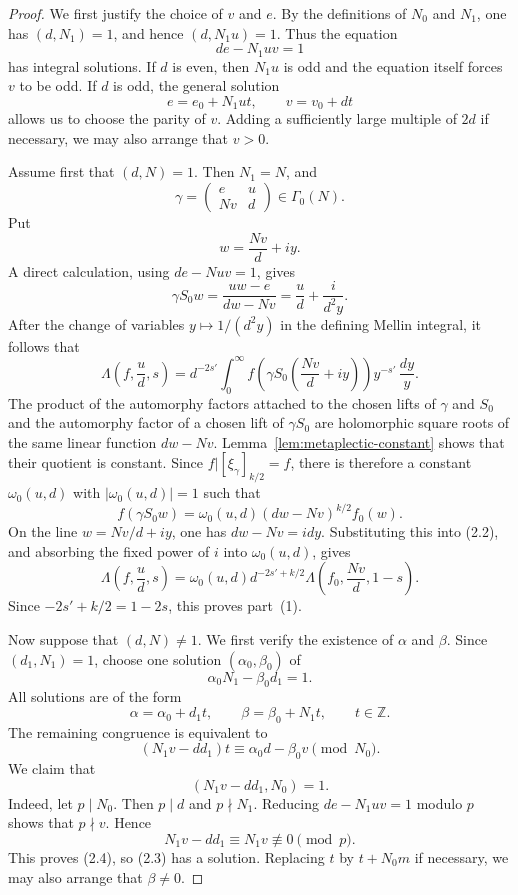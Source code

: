 \documentclass[11pt]{amsart}
\theoremstyle{remark}
\newcommand{\Z}{\mathbb Z}
\begin{document}
\begin{proof}
We first justify the choice of $v$ and $e$. By the definitions of $N_0$ and
$N_1$, one has $(d,N_1)=1$, and hence $(d,N_1u)=1$. Thus the equation
\[
de-N_1uv=1
\]
has integral solutions. If $d$ is even, then $N_1u$ is odd and the equation
itself forces $v$ to be odd. If $d$ is odd, the general solution
\[
e=e_0+N_1ut,\qquad v=v_0+dt
\]
allows us to choose the parity of $v$. Adding a sufficiently large multiple
of $2d$ if necessary, we may also arrange that $v>0$.

Assume first that $(d,N)=1$. Then $N_1=N$, and
\[
\gamma=\begin{pmatrix}e&u\\Nv&d\end{pmatrix}\in\Gamma_0(N).
\]
Put
\[
w=\frac{Nv}{d}+iy.
\]
A direct calculation, using $de-Nuv=1$, gives
\[
\gamma S_0w
=\frac{u w-e}{d w-Nv}
=\frac ud+\frac{i}{d^2y}.
\tag{2.1}
\]
After the change of variables $y\mapsto 1/(d^2y)$ in the defining Mellin
integral, it follows that
\[
\Lambda\left(f,\frac ud,s\right)
=d^{-2s'}\int_0^\infty
f\left(\gamma S_0\left(\frac{Nv}{d}+iy\right)\right)
y^{-s'}\,\frac{dy}{y}.
\tag{2.2}
\]
The product of the automorphy factors attached to the chosen lifts of
$\gamma$ and $S_0$ and the automorphy factor of a chosen lift of
$\gamma S_0$ are holomorphic square roots of the same linear function
$d w-Nv$. Lemma~\ref{lem:metaplectic-constant} shows that their quotient
is constant. Since $f|[\xi_\gamma]_{k/2}=f$, there is therefore a constant
$\omega_0(u,d)$ with $|\omega_0(u,d)|=1$ such that
\[
f(\gamma S_0w)
=\omega_0(u,d)(d w-Nv)^{k/2}f_0(w).
\]
On the line $w=Nv/d+iy$, one has $d w-Nv=idy$. Substituting this into
(2.2), and absorbing the fixed power of $i$ into $\omega_0(u,d)$, gives
\[
\Lambda\left(f,\frac ud,s\right)
=\omega_0(u,d)d^{-2s'+k/2}
\Lambda\left(f_0,\frac{Nv}{d},1-s\right).
\]
Since $-2s'+k/2=1-2s$, this proves part~\textup{(1)}.

Now suppose that $(d,N)\ne1$. We first verify the existence of $\alpha$
and $\beta$. Since $(d_1,N_1)=1$, choose one solution $(\alpha_0,\beta_0)$
of
\[
\alpha_0N_1-\beta_0d_1=1.
\]
All solutions are of the form
\[
\alpha=\alpha_0+d_1t,
\qquad
\beta=\beta_0+N_1t,
\qquad t\in\Z.
\]
The remaining congruence is equivalent to
\[
(N_1v-dd_1)t\equiv \alpha_0d-\beta_0v\pmod{N_0}.
\tag{2.3}
\]
We claim that
\[
(N_1v-dd_1,N_0)=1.
\tag{2.4}
\]
Indeed, let $p\mid N_0$. Then $p\mid d$ and $p\nmid N_1$. Reducing
$de-N_1uv=1$ modulo $p$ shows that $p\nmid v$. Hence
\[
N_1v-dd_1\equiv N_1v\not\equiv0\pmod p.
\]
This proves (2.4), so (2.3) has a solution. Replacing $t$ by $t+N_0m$ if
necessary, we may also arrange that $\beta\ne0$.


\end{proof}
\end{document}

